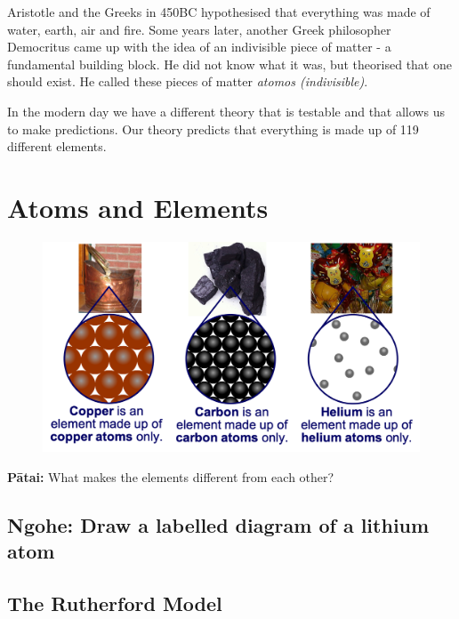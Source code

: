\documentclass[12pt]{report}
\begin{document}
Aristotle and the Greeks in 450BC hypothesised that everything was made of water, earth, air and fire. Some years later, another Greek philosopher Democritus came up with the idea of an indivisible piece of matter - a fundamental building block. He did not know what it was, but theorised that one should exist. He called these pieces of matter \textit{atomos (indivisible)}.

In the modern day we have a different theory that is testable and that allows us to make predictions. Our theory predicts that everything is made up of 119 different elements.

\section{Atoms and Elements}

\begin{figure}
	\vspace{-1cm}
	\begin{center}
		\includegraphics[width=0.9\linewidth]{elements.png}
	\end{center}
\end{figure}

\textbf{Pātai:} What makes the elements different from each other?\\
\vspace{2cm}

\subsection{Ngohe: Draw a labelled diagram of a lithium atom}

\newpage
\subsection{The Rutherford Model}
\end{document}
